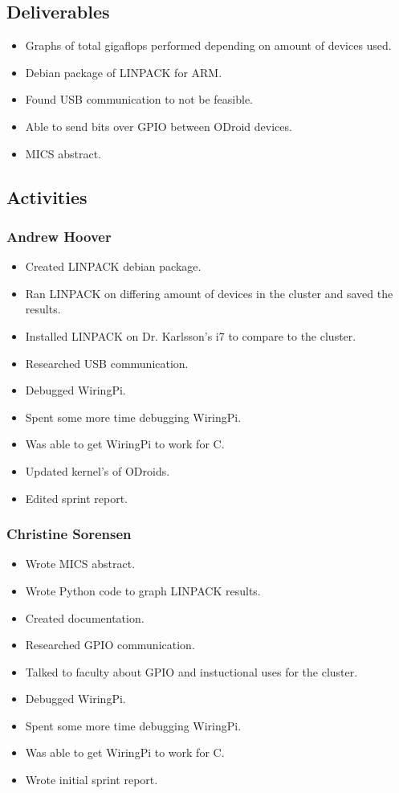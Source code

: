 \subsection*{Deliverables}
\begin{itemize}
	\item Graphs of total gigaflops performed depending on amount of devices used.
	\item Debian package of LINPACK for ARM.
	\item Found USB communication to not be feasible.
	\item Able to send bits over GPIO between ODroid devices.
	\item MICS abstract.
\end{itemize}

\subsection*{Activities}

\subsubsection*{Andrew Hoover}
\begin{itemize}
	\item Created LINPACK debian package.
	\item Ran LINPACK on differing amount of devices in the cluster and saved the results.
	\item Installed LINPACK on Dr. Karlsson's i7 to compare to the cluster.
	\item Researched USB communication.
	\item Debugged WiringPi.
	\item Spent some more time debugging WiringPi.
	\item Was able to get WiringPi to work for C.
	\item Updated kernel's of ODroids.
	\item Edited sprint report.
\end{itemize}
\subsubsection*{Christine Sorensen}
\begin{itemize}
	\item Wrote MICS abstract.
	\item Wrote Python code to graph LINPACK results.
	\item Created documentation.
	\item Researched GPIO communication.
	\item Talked to faculty about GPIO and instuctional uses for the cluster.
	\item Debugged WiringPi.
	\item Spent some more time debugging WiringPi.
	\item Was able to get WiringPi to work for C.
	\item Wrote initial sprint report.
\end{itemize}

